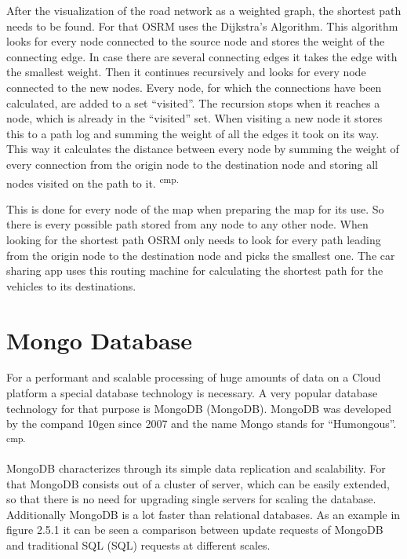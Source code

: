 After the visualization of the road network as a weighted graph, the shortest path needs to be found. For that OSRM uses the Dijkstra's Algorithm. This algorithm looks for every node connected to the source node and stores the weight of the connecting edge. In case there are several connecting edges it takes the edge with the smallest weight. Then it continues recursively and looks for every node connected to the new nodes. Every node, for which the connections have been calculated, are added to a set ``visited''. The recursion stops when it reaches a node, which is already in the ``visited'' set. When visiting a new node it stores this to a path log and summing the weight of all the edges it took on its way. This way it calculates the distance between every node by summing the weight of every connection from the origin node to the destination node and storing all nodes visited on the path to it.  \textsuperscript{cmp.\cite{32}}


This is done for every node of the map when preparing the map for its use. So there is every possible path stored from any node to any other node. When looking for the shortest path OSRM only needs to look for every path leading from the origin node to the destination node and picks the smallest one. The car sharing app uses this routing machine for calculating the shortest path for the vehicles to its destinations.

\section{Mongo Database}

For a performant and scalable processing of huge amounts of data on a Cloud platform a special database technology is necessary. A very popular database technology for that purpose is \acs{MongoDB} (\acl{MongoDB}). MongoDB was developed by the compand 10gen since 2007 and the name Mongo stands for ``Humongous''.  \textsuperscript{cmp.\cite{33}}


MongoDB characterizes through its simple data replication and scalability. For that MongoDB consists out of a cluster of server, which can be easily extended, so that there is no need for upgrading single servers for scaling the database. Additionally MongoDB is a lot faster than relational databases. As an example in figure 2.5.1 it can be seen a comparison between update requests of MongoDB and traditional \acs{SQL} (\acl{SQL}) requests at different scales.

